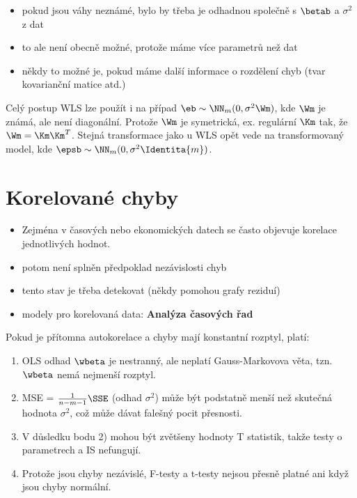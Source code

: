 \begin{remark}
\begin{itemize}
	\item pokud jsou váhy neznámé, bylo by třeba je odhadnou společně s $\betab$ a $\sigma^2$ z dat
	\item to ale není obecně možné, protože máme více parametrů než dat
	\item někdy to možné je, pokud máme další informace o rozdělení chyb (tvar kovarianční matice atd.)
\end{itemize}
\end{remark}

\begin{remark}
	Celý postup WLS lze použít i na případ $\eb \sim \NN_m(0,\sigma^2 \Wm)$, kde $\Wm$ je známá, ale není diagonální. Protože $\Wm$ je symetrická, ex. regulární $\Km$ tak, že $\Wm = \Km \Km^T$. Stejná transformace jako u WLS opět vede na transformovaný model, kde $\epsb \sim \NN_m(0,\sigma^2 \Identita{m})$.
\end{remark}

\section{Korelované chyby}
\begin{itemize}
\item Zejména v časových nebo ekonomických datech se často objevuje korelace jednotlivých hodnot.
\item potom není splněn předpoklad nezávislosti chyb
\item tento stav je třeba detekovat (někdy pomohou grafy reziduí)
\item modely pro korelovaná data: \textbf{Analýza časových řad}
\end{itemize}

Pokud je přítomna autokorelace a chyby mají konstantní rozptyl, platí:
\begin{enumerate}
\item OLS odhad $\wbeta$ je nestranný, ale neplatí Gauss-Markovova věta, tzn. $\wbeta$ nemá nejmenší rozptyl.
\item MSE = $\frac{1}{n-m-1}\SSE$ (odhad $\sigma^2$) může být podstatně menší než skutečná hodnota $\sigma^2$, což může dávat falešný pocit přesnosti.
\item V důsledku bodu 2) mohou být zvětšeny hodnoty T statistik, takže testy o parametrech a IS nefungují.
\item Protože jsou chyby nezávislé, F-testy a t-testy nejsou přesně platné ani když jsou chyby normální.
\end{enumerate}


